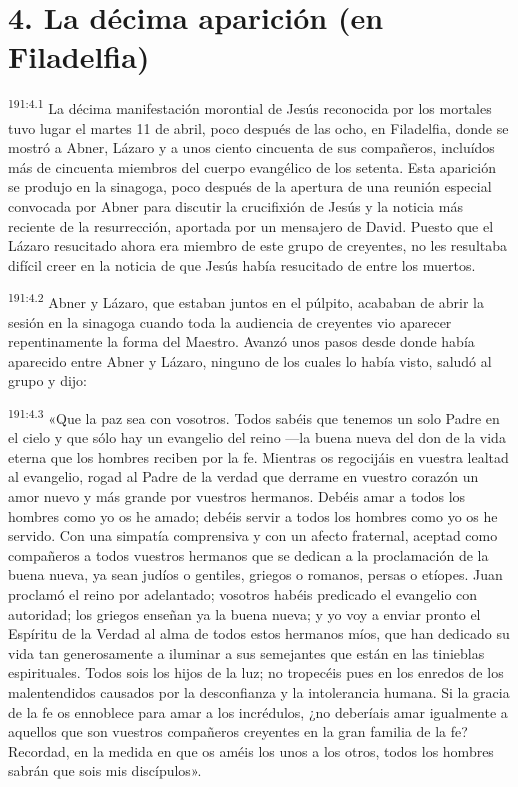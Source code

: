 \section*{4. La décima aparición (en Filadelfia)}
\par 
\textsuperscript{191:4.1} La décima manifestación morontial de Jesús reconocida por los mortales tuvo lugar el martes 11 de abril, poco después de las ocho, en Filadelfia, donde se mostró a Abner, Lázaro y a unos ciento cincuenta de sus compañeros, incluídos más de cincuenta miembros del cuerpo evangélico de los setenta. Esta aparición se produjo en la sinagoga, poco después de la apertura de una reunión especial convocada por Abner para discutir la crucifixión de Jesús y la noticia más reciente de la resurrección, aportada por un mensajero de David. Puesto que el Lázaro resucitado ahora era miembro de este grupo de creyentes, no les resultaba difícil creer en la noticia de que Jesús había resucitado de entre los muertos.

\par 
\textsuperscript{191:4.2} Abner y Lázaro, que estaban juntos en el púlpito, acababan de abrir la sesión en la sinagoga cuando toda la audiencia de creyentes vio aparecer repentinamente la forma del Maestro. Avanzó unos pasos desde donde había aparecido entre Abner y Lázaro, ninguno de los cuales lo había visto, saludó al grupo y dijo:

\par 
\textsuperscript{191:4.3} «Que la paz sea con vosotros. Todos sabéis que tenemos un solo Padre en el cielo y que sólo hay un evangelio del reino ---la buena nueva del don de la vida eterna que los hombres reciben por la fe. Mientras os regocijáis en vuestra lealtad al evangelio, rogad al Padre de la verdad que derrame en vuestro corazón un amor nuevo y más grande por vuestros hermanos. Debéis amar a todos los hombres como yo os he amado; debéis servir a todos los hombres como yo os he servido. Con una simpatía comprensiva y con un afecto fraternal, aceptad como compañeros a todos vuestros hermanos que se dedican a la proclamación de la buena nueva, ya sean judíos o gentiles, griegos o romanos, persas o etíopes. Juan proclamó el reino por adelantado; vosotros habéis predicado el evangelio con autoridad; los griegos enseñan ya la buena nueva; y yo voy a enviar pronto el Espíritu de la Verdad al alma de todos estos hermanos míos, que han dedicado su vida tan generosamente a iluminar a sus semejantes que están en las tinieblas espirituales. Todos sois los hijos de la luz; no tropecéis pues en los enredos de los malentendidos causados por la desconfianza y la intolerancia humana. Si la gracia de la fe os ennoblece para amar a los incrédulos, ¿no deberíais amar igualmente a aquellos que son vuestros compañeros creyentes en la gran familia de la fe? Recordad, en la medida en que os améis los unos a los otros, todos los hombres sabrán que sois mis discípulos».

